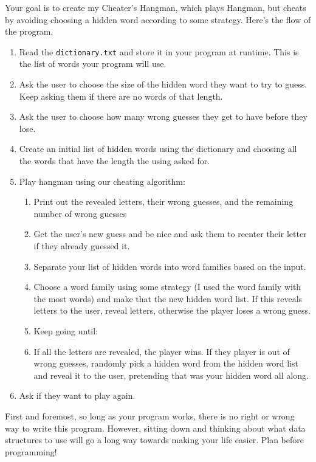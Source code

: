 \documentclass[10pt,letterpaper]{article}
\begin{document}
Your goal is to create my Cheater's Hangman, which plays Hangman, but cheats by avoiding choosing a hidden word according to some strategy.
Here's the flow of the program.

\begin{enumerate}
	\item Read the \texttt{dictionary.txt} and store it in your program at runtime.  This is the list of words your program will use.

	
	\item Ask the user to choose the size of the hidden word they want to try to guess. Keep asking them if there are no words of that length.
	\item Ask the user to choose how many wrong guesses they get to have before they lose.
	\item Create an initial list of hidden words using the dictionary and choosing all the words that have the length the using asked for.
	\item Play hangman using our cheating algorithm:
	\begin{enumerate}
		\item Print out the revealed letters, their wrong guesses, and the remaining number of wrong guesses
		\item Get the user's new guess and be nice and ask them to reenter their letter if they already guessed it.
		\item Separate your list of hidden words into word families based on the input. 
		\item Choose a word family using some strategy (I used the word family with the most words) and make that the new hidden word list.
		If this reveals letters to the user, reveal letters, otherwise the player loses a wrong guess.
		\item Keep going until:
		\item If all the letters are revealed, the player wins. If they player is out of wrong guesses, randomly pick a hidden word from the hidden word list and reveal it to the user, pretending that was your hidden word all along.
	\end{enumerate}
	\item Ask if they want to play again.
	
	
\end{enumerate}



First and foremost, so long as your program works, there is no right or wrong way to write this program.
However, sitting down and thinking about what data structures to use will go a long way towards making your life easier.
Plan before programming!
\end{document}
